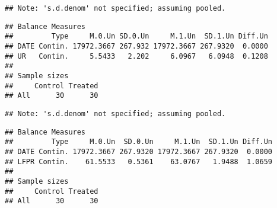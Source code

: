 \documentclass[
]{article}
\newenvironment{Shaded}{\begin{snugshade}}{\end{snugshade}}
\newcommand{\AttributeTok}[1]{\textcolor[rgb]{0.77,0.63,0.00}{#1}}
\newcommand{\CommentTok}[1]{\textcolor[rgb]{0.56,0.35,0.01}{\textit{#1}}}
\newcommand{\DecValTok}[1]{\textcolor[rgb]{0.00,0.00,0.81}{#1}}
\newcommand{\FunctionTok}[1]{\textcolor[rgb]{0.00,0.00,0.00}{#1}}
\newcommand{\NormalTok}[1]{#1}
\newcommand{\OtherTok}[1]{\textcolor[rgb]{0.56,0.35,0.01}{#1}}
\newcommand{\SpecialCharTok}[1]{\textcolor[rgb]{0.00,0.00,0.00}{#1}}
\newcommand{\StringTok}[1]{\textcolor[rgb]{0.31,0.60,0.02}{#1}}
\begin{document}
\begin{verbatim}
## Note: 's.d.denom' not specified; assuming pooled.
\end{verbatim}

\begin{verbatim}
## Balance Measures
##         Type     M.0.Un SD.0.Un     M.1.Un  SD.1.Un Diff.Un
## DATE Contin. 17972.3667 267.932 17972.3667 267.9320  0.0000
## UR   Contin.     5.5433   2.202     6.0967   6.0948  0.1208
## 
## Sample sizes
##     Control Treated
## All      30      30
\end{verbatim}

\begin{Shaded}
\end{Shaded}

\begin{verbatim}
## Note: 's.d.denom' not specified; assuming pooled.
\end{verbatim}

\begin{verbatim}
## Balance Measures
##         Type     M.0.Un  SD.0.Un     M.1.Un  SD.1.Un Diff.Un
## DATE Contin. 17972.3667 267.9320 17972.3667 267.9320  0.0000
## LFPR Contin.    61.5533   0.5361    63.0767   1.9488  1.0659
## 
## Sample sizes
##     Control Treated
## All      30      30
\end{verbatim}
\end{document}
